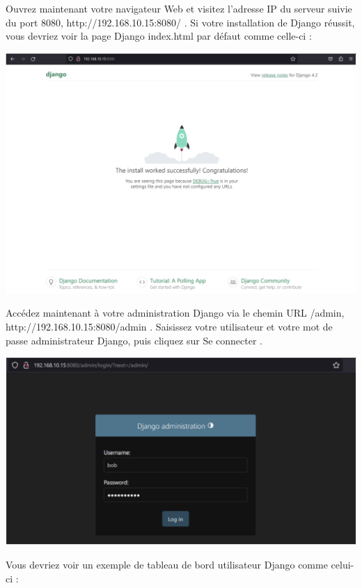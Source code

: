 \documentclass{article}
\begin{document}
Ouvrez maintenant votre navigateur Web et visitez l'adresse IP du serveur suivie du port 8080, http://192.168.10.15:8080/ . Si votre installation de Django réussit, vous devriez voir la page Django index.html par défaut comme celle-ci :

\begin{center}
\includegraphics[width=15cm]{images/image17.png}
\end{center}

Accédez maintenant à votre administration Django via le chemin URL /admin, http://192.168.10.15:8080/admin . Saisissez votre utilisateur et votre mot de passe administrateur Django, puis cliquez sur Se connecter .

\begin{center}
\includegraphics[width=15cm]{images/image18.png}
\end{center}

Vous devriez voir un exemple de tableau de bord utilisateur Django comme celui-ci :
\end{document}
